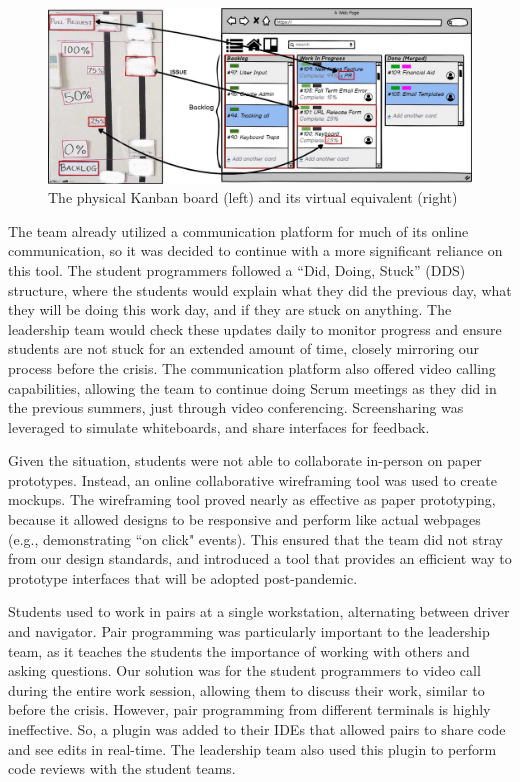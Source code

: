 \begin{figure}[h]
 \centering
 \includegraphics[width=0.8\linewidth]{InkedupdatedTrelloKanban_edit.jpg}
 \caption{The physical Kanban board (left) and its virtual equivalent (right)}
 \label{fig:digitalkanban}
\end{figure}

The team already utilized a communication platform for much of its online communication, so it was decided to continue with a more significant reliance on this tool. The student programmers followed a ``Did, Doing, Stuck'' (DDS) structure, where the students would explain what they did the previous day, what they will be doing this work day, and if they are stuck on anything. The leadership team would check these updates daily to monitor progress and ensure students are not stuck for an extended amount of time, closely mirroring our process before the crisis. The communication platform also offered video calling capabilities, allowing the team to continue doing Scrum meetings as they did in the previous summers, just through video conferencing. Screensharing was leveraged to simulate whiteboards, and share interfaces for feedback.

Given the situation, students were not able to collaborate in-person on paper prototypes. Instead, an online collaborative wireframing tool was used to create mockups. The wireframing tool proved nearly as effective as paper prototyping, because it allowed designs to be responsive and perform like actual webpages (e.g., demonstrating ``on click" events). This ensured that the team did not stray from our design standards, and introduced a tool that provides an efficient way to prototype interfaces that will be adopted post-pandemic.

Students used to work in pairs at a single workstation, alternating between driver and navigator. Pair programming was particularly important to the leadership team, as it teaches the students the importance of working with others and asking questions. Our solution was for the student programmers to video call during the entire work session, allowing them to discuss their work, similar to before the crisis. However, pair programming from different terminals is highly ineffective. So, a plugin was added to their IDEs that allowed pairs to share code and see edits in real-time. The leadership team also used this plugin to perform code reviews with the student teams.

